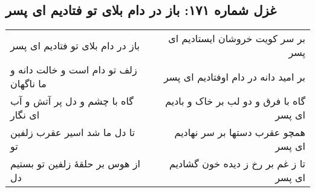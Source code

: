 \begin{center}
\section*{غزل شماره ۱۷۱: باز در دام بلای تو فتادیم ای پسر}
\label{sec:171}
\begin{longtable}{l p{0.5cm} r}
باز در دام بلای تو فتادیم ای پسر
&&
بر سر کویت خروشان ایستادیم ای پسر
\\
زلف تو دام است و خالت دانه و ما ناگهان
&&
بر امید دانه در دام اوفتادیم ای پسر
\\
گاه با چشم و دل پر آتش و آب ای نگار
&&
گاه با فرق و دو لب بر خاک و بادیم ای پسر
\\
تا دل ما شد اسیر عقرب زلفین تو
&&
همچو عقرب دستها بر سر نهادیم ای پسر
\\
از هوس بر حلقهٔ زلفین تو بستیم دل
&&
تا ز غم بر رخ ز دیده خون گشادیم ای پسر
\\
\end{longtable}
\end{center}
